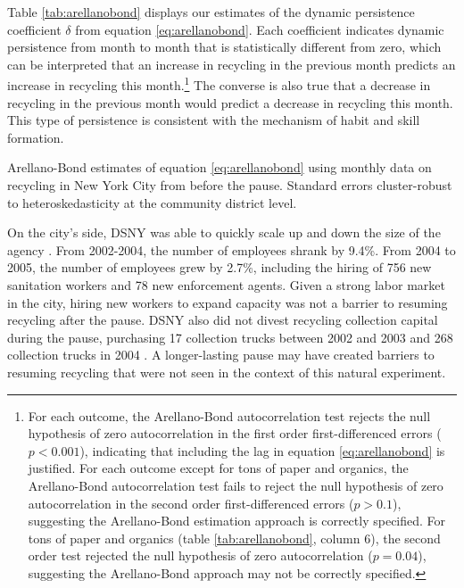 \documentclass[12pt]{article}
\begin{document}
Table \ref{tab:arellanobond} displays our estimates of the dynamic persistence coefficient \(\delta\) from equation \ref{eq:arellanobond}.  Each coefficient indicates dynamic persistence from month to month that is statistically different from zero, which can be interpreted that an increase in recycling in the previous month predicts an increase in recycling this month.\footnote{For each outcome, the Arellano-Bond autocorrelation test rejects the null hypothesis of zero autocorrelation in the first order first-differenced errors (\(p<0.001\)), indicating that including the lag in equation \ref{eq:arellanobond} is justified.  For each outcome except for tons of paper and organics, the Arellano-Bond autocorrelation test fails to reject the null hypothesis of zero autocorrelation in the second order first-differenced errors (\(p>0.1\)), suggesting the Arellano-Bond estimation approach is correctly specified.  For tons of paper and organics (table \ref{tab:arellanobond}, column 6), the second order test rejected the null hypothesis of zero autocorrelation (\(p=0.04\)), suggesting the Arellano-Bond approach may not be correctly specified.}  The converse is also true that a decrease in recycling in the previous month would predict a decrease in recycling this month.  This type of persistence is consistent with the mechanism of habit and skill formation.

\begin{table}
    \centering
    \small
    
    \caption{Arellano-Bond estimates of equation \ref{eq:arellanobond} using monthly data on recycling in New York City from before the pause.  Standard errors cluster-robust to heteroskedasticity at the community district level.}
    \label{tab:arellanobond}
\end{table}

On the city's side, DSNY was able to quickly scale up and down the size of the agency \citep{dsnyreports}.  From 2002-2004, the number of employees shrank by 9.4\%.  From 2004 to 2005, the number of employees grew by 2.7\%, including the hiring of 756 new sanitation workers and 78 new enforcement agents.  Given a strong labor market in the city, hiring new workers to expand capacity was not a barrier to resuming recycling after the pause.  DSNY also did not divest recycling collection capital during the pause, purchasing 17 collection trucks between 2002 and 2003 and 268 collection trucks in 2004 \citep{dsnyreports}.  A longer-lasting pause may have created barriers to resuming recycling that were not seen in the context of this natural experiment.
\end{document}
